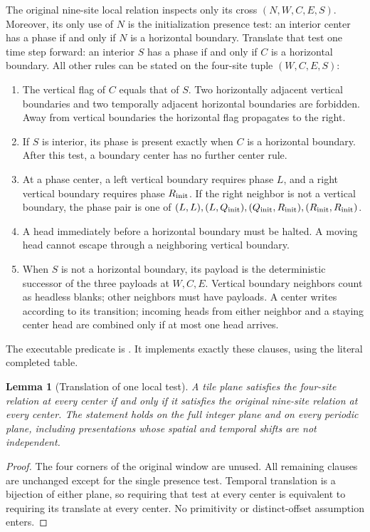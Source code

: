 \documentclass[11pt,a4paper]{article}
\newtheorem{lemma}[theorem]{Lemma}
\theoremstyle{remark}\newtheorem{remark}[theorem]{Remark}
\newcommand{\src}[1]{\texttt{\detokenize{#1}}}
\begin{document}
The original nine-site local relation inspects only its cross
$(N,W,C,E,S)$. Moreover, its only use of $N$ is the initialization
presence test: an interior center has a phase if and only if $N$
is a horizontal boundary. Translate that test one time step forward:
an interior $S$ has a phase if and only if $C$ is a horizontal
boundary. All other rules can be stated on the four-site tuple
$(W,C,E,S)$:
\begin{enumerate}
\item The vertical flag of $C$ equals that of $S$. Two horizontally
adjacent vertical boundaries and two temporally adjacent horizontal
boundaries are forbidden. Away from vertical boundaries the horizontal
flag propagates to the right.
\item If $S$ is interior, its phase is present exactly when $C$ is a
horizontal boundary. After this test, a boundary center has no
further center rule.
\item At a phase center, a left vertical boundary requires phase $L$,
and a right vertical boundary requires phase $R_{\rm init}$.
If the right neighbor is not a vertical boundary, the phase pair is
one of
$(L,L),(L,Q_{\rm init}),(Q_{\rm init},R_{\rm init}),
(R_{\rm init},R_{\rm init})$.
\item A head immediately before a horizontal boundary must be halted.
A moving head cannot escape through a neighboring vertical boundary.
\item When $S$ is not a horizontal boundary, its payload is the
deterministic successor of the three payloads at $W,C,E$.
Vertical boundary neighbors count as headless blanks; other neighbors
must have payloads. A center writes according to its transition;
incoming heads from either neighbor and a staying center head are
combined only if at most one head arrives.
\end{enumerate}
The executable predicate is \src{compiler/tshape_helical.py:local_valid}.
It implements exactly these clauses, using the literal completed table.

\begin{lemma}[Translation of one local test]\label{lem:translate}
A tile plane satisfies the four-site relation at every center if and
only if it satisfies the original nine-site relation at every center.
The statement holds on the full integer plane and on every periodic
plane, including presentations whose spatial and temporal shifts
are not independent.
\end{lemma}
\begin{proof}
The four corners of the original window are unused. All remaining
clauses are unchanged except for the single presence test. Temporal
translation is a bijection of either plane, so requiring that test
at every center is equivalent to requiring its translate at every
center. No primitivity or distinct-offset assumption enters.
\end{proof}
\end{document}
